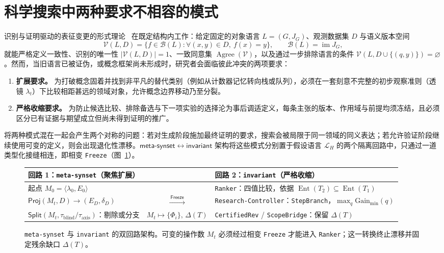 \documentclass[11pt,a4paper,UTF8,fontset=fandol]{ctexart}
\DeclareRobustCommand{\id}[1]{\nolinkurl{#1}}
\begin{document}
\section{科学搜索中两种要求不相容的模式}
识别与证明驱动的表征变更的形式理论~\cite{g1112,angluin} 在既定结构内工作：给定固定的对象语言 $L=(G,J_G)$、观测数据集 $D$ 与语义版本空间
\begin{equation}
 \mathcal V(L,D)=\{f\in \mathcal B(L):\forall(x,y)\in D,\ f(x)=y\},\qquad \mathcal B(L)=\operatorname{im}J_G,
\end{equation}
就能严格定义一致性、识别的唯一性 $|\mathcal V(L,D)|=1$、一致同意集 $\operatorname{Agree}(\mathcal V)$，以及通过一步排除语言的条件 $\mathcal V(L,D\cup\{(q,y)\})=\varnothing$。然而，当旧语言已被证伪，或概念框架尚未形成时，研究者会面临彼此冲突的两项要求：
\begin{enumerate}
\item \textbf{扩展要求。} 为打破概念固着并找到非平凡的替代类别（例如从计数器记忆转向栈或队列），必须在一套刻意不完整的初步观察准则（透镜 $\lambda_t$）下比较相距甚远的领域对象，允许概念边界移动乃至分裂。
\item \textbf{严格收缩要求。} 为防止候选比较、排除备选与下一项实验的选择沦为事后调适定义，每条主张的版本、作用域与前提均须冻结，且必须区分已有证据与期望成立但尚未得到证明的推广。
\end{enumerate}
将两种模式混在一起会产生两个对称的问题：若对生成阶段施加最终证明的要求，搜索会被局限于同一领域的同义表达；若允许验证阶段继续使用可变的定义，则会出现退化性漂移。$\mathsf{meta\mbox{-}synset}\leftrightarrow\mathsf{invariant}$ 架构将这些模式分别置于假设语言 $\mathcal L_H$ 的两个隔离回路中，只通过一道类型化接缝相连，即相变 \id{Freeze}（图~\ref{fig:dual}）。

\begin{figure}[htbp]
\centering\small
\begin{tabularx}{\linewidth}{@{}XcX@{}}
\toprule
回路 1：\id{meta-synset}（聚焦扩展） && 回路 2：\id{invariant}（严格收缩）\\
\midrule
起点 $M_0=\langle\lambda_0,E_0\rangle$
&& \id{Ranker}：四值比较，依据 $\operatorname{Ent}(T_2)\subseteq\operatorname{Ent}(T_1)$\\
$\mathsf{Proj}(M_t,D)\to(E_D,\delta_D)$
& $\xrightarrow{\ \mathsf{Freeze}\ }$ & \id{Research-Controller}：\id{StepBranch}，$\max_q\mathrm{Gain}_{\min}(q)$\\
$\mathsf{Split}(M_t,\tau_{\mathrm{blind}}/\tau_{\mathrm{axis}})$：剔除或分支
& $M_t\longmapsto\{\Phi_i\},\,\Delta(T)$ & \id{CertifiedRev} / \id{ScopeBridge}：保留 $\Delta(T)$\\
\bottomrule
\end{tabularx}
\caption{\id{meta-synset} 与 \id{invariant} 的双回路架构。可变的操作数 $M_t$ 必须经过相变 \id{Freeze} 才能进入 \id{Ranker}；这一转换终止漂移并固定残余缺口 $\Delta(T)$。}
\label{fig:dual}
\end{figure}
\end{document}
